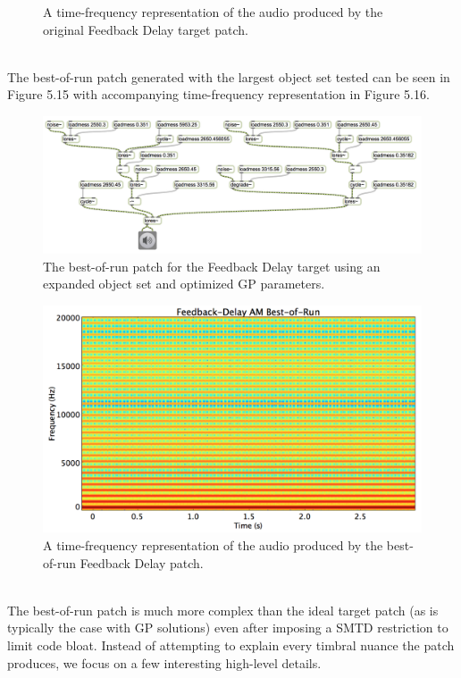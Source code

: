 \documentclass[a4paper,12pt]{report} 	%
\numberwithin{figure}{chapter}
\numberwithin{table}{chapter}
\numberwithin{equation}{chapter}
\begin{document}
\begin{flushleft}
\begin{figure}[h!]
\begin{center}
\caption[Original Feedback Delay Time-Frequency Representation]{A time-frequency representation of the audio produced by the original Feedback Delay target patch.}
\end{center}
\end{figure}
\\
The best-of-run patch generated with the largest object set tested can be seen in Figure 5.15 with accompanying time-frequency representation in Figure 5.16.
\begin{figure}[h!]
\begin{center}
\includegraphics[angle=270, scale=0.60]{DelayFeedbackAM_Best}
\caption[Feedback Delay Best-of-Run Patch]{The best-of-run patch for the Feedback Delay target using an expanded object set and optimized GP parameters.}
\end{center}
\end{figure}
\begin{figure}[h!]
\begin{center}
\includegraphics[scale=0.35,width=\linewidth]{FeedbackDelayAMBestOfRunSTFT}
\caption[Best-of-Run Feedback Delay Time-Frequency Representation]{A time-frequency representation of the audio produced by the best-of-run Feedback Delay patch.}
\end{center}
\end{figure}
\\
The best-of-run patch is much more complex than the ideal target patch (as is typically the case with GP solutions) even after imposing a SMTD restriction to limit code bloat. Instead of attempting to explain every timbral nuance the patch produces, we focus on a few interesting high-level details.


\end{flushleft}
\end{document}
